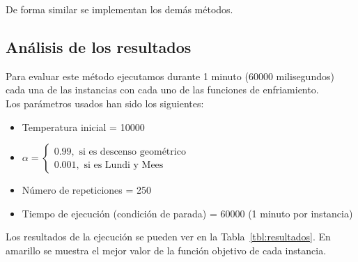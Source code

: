 \documentclass[12pt,a4paper,twoside,openright,titlepage,final]{article}
\begin{document}
De forma similar se implementan los demás métodos.

\subsection{Análisis de los resultados}

Para evaluar este método ejecutamos durante 1 minuto (60000 milisegundos) cada una de las instancias con cada uno de las funciones de enfriamiento.\\

Los parámetros usados han sido los siguientes:

\begin{itemize}
	\item Temperatura inicial = 10000
	\item $\alpha = \begin{cases}
	0.99, \text{ si es descenso geométrico}\\
	0.001, \text{ si es Lundi y Mees}
	\end{cases}$
	\item Número de repeticiones = 250
	\item Tiempo de ejecución (condición de parada) = 60000 (1 minuto por instancia)
\end{itemize}

Los resultados de la ejecución se pueden ver en la Tabla~\ref{tbl:resultados}. En amarillo se muestra el mejor valor de la función objetivo de cada instancia.\\
\end{document}
